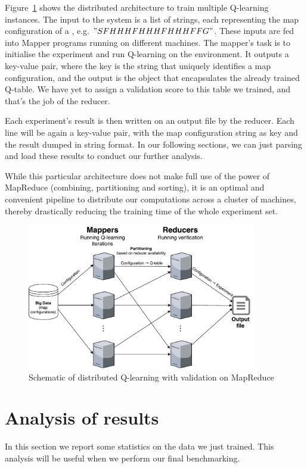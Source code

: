 Figure~\ref{fig:MapReduce} shows the distributed architecture to train multiple Q-learning instances. The input to the system is a list of strings, each representing the map configuration of a , e.g. $"SFHHHFHHHFHHHFFG"$. These inputs are fed into Mapper programs running on different machines. The mapper's task is to initialise the experiment and run Q-learning on the environment. It outputs a key-value pair, where the key is the string that uniquely identifies a map configuration, and the output is the  object that encapsulates the already trained Q-table. We have yet to assign a validation score to this table we trained, and that's the job of the reducer.

Each experiment's result is then written on an output file by the reducer. Each line will be again a key-value pair, with the map configuration string as key and the  result dumped in string format. In our following sections, we can just parsing and load these results to conduct our further analysis.

While this particular architecture does not make full use of the power of MapReduce (combining, partitioning and sorting), it is an optimal and convenient pipeline to distribute our computations across a cluster of machines, thereby drastically reducing the training time of the whole experiment set.
\begin{figure}
\centering
\includegraphics[width=10cm]{Figures/MapReduce}
\caption{Schematic of distributed Q-learning with validation on MapReduce}
\label{fig:MapReduce}
\end{figure}

\section{Analysis of results}
\label{sec:analysisresults}
In this section we report some statistics on the data we just trained. This analysis will be useful when we perform our final benchmarking.

